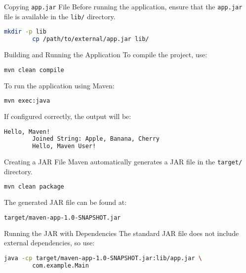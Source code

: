 \documentclass[aspectratio=169, table]{beamer}
\begin{document}
\begin{frame}[fragile]{Copying \texttt{app.jar} File}
	Before running the application, ensure that the \texttt{app.jar} file is available in the \texttt{lib/} directory.
	\begin{lstlisting}[language=bash]
		mkdir -p lib
		cp /path/to/external/app.jar lib/
	\end{lstlisting}
\end{frame}

\begin{frame}[fragile]{Building and Running the Application}
	To compile the project, use:
	\begin{lstlisting}[language=bash]
		mvn clean compile
	\end{lstlisting}
	
	To run the application using Maven:
	\begin{lstlisting}[language=bash]
		mvn exec:java
	\end{lstlisting}
	
	If configured correctly, the output will be:
	\begin{lstlisting}[language=bash]
		Hello, Maven!
		Joined String: Apple, Banana, Cherry
		Hello, Maven User!
	\end{lstlisting}
\end{frame}

\begin{frame}[fragile]{Creating a JAR File}
	Maven automatically generates a JAR file in the \texttt{target/} directory.
	\begin{lstlisting}[language=bash]
		mvn clean package
	\end{lstlisting}
	
	The generated JAR file can be found at:
	\begin{lstlisting}[language=bash]
		target/maven-app-1.0-SNAPSHOT.jar
	\end{lstlisting}
\end{frame}

\begin{frame}[fragile]{Running the JAR with Dependencies}
	The standard JAR file does not include external dependencies, so use:
	\begin{lstlisting}[language=bash]
		java -cp target/maven-app-1.0-SNAPSHOT.jar:lib/app.jar \
		com.example.Main
	\end{lstlisting}
\end{frame}
\end{document}
